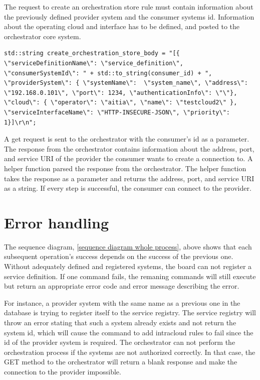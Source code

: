 The request to create an orchestration store rule must contain information about the previously defined provider system and the consumer systems id.
Information about the operating cloud and interface has to be defined, and posted to the orchestrator core system.
\begin{lstlisting}[style=CStyle]
std::string create_orchestration_store_body = "[{ \"serviceDefinitionName\": \"service_definition\", \"consumerSystemId\": " + std::to_string(consumer_id) + ", \"providerSystem\": { \"systemName\":  \"system_name\", \"address\": \"192.168.0.101\", \"port\": 1234, \"authenticationInfo\": \"\"}, \"cloud\": { \"operator\": \"aitia\", \"name\": \"testcloud2\" }, \"serviceInterfaceName\": \"HTTP-INSECURE-JSON\", \"priority\": 1}]\r\n";
\end{lstlisting}
A get request is sent to the orchestrator with the consumer's id as a parameter.
The response from the orchestrator contains information about the address, port, and service URI of the provider the consumer wants to create a connection to.
A helper function parsed the response from the orchestrator.
The helper function takes the response as a parameter and returns the address, port, and service URI as a string.
If every step is successful, the consumer can connect to the provider.

\section{Error handling}
The sequence diagram, \ref{sequence diagram whole process}, above shows that each subsequent operation's success depends on the success of the previous one.
Without adequately defined and registered systems, the board can not register a service definition. If one command fails, 
the remaning commands will still execute but return an appropriate error code and error message describing the error.

For instance, a provider system with the same name as a previous one in the database is trying to register itself to the service registry.
The service registry will throw an error stating that such a system already exists and not return the system id, which will cause the command to add intracloud rules to fail since the id of the provider system is required. 
The orchestrator can not perform the orchestration process if the systems are not authorized correctly.  In that case, the GET method to the orchestrator will return a blank response and make the connection to the provider impossible. 
